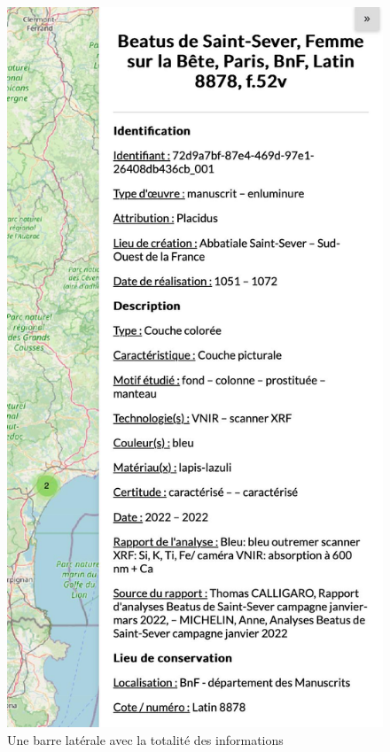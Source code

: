 \begin{landscape}
\begin{figure}[p]
\begin{minipage}{0.3\linewidth}
			\includegraphics[scale=0.25]{./textes/chap2/slidebar.jpg}
			\caption{Une barre latérale avec la totalité des informations}
			\label{fig:info2}
		\end{minipage}
	\end{figure}
\end{landscape}

